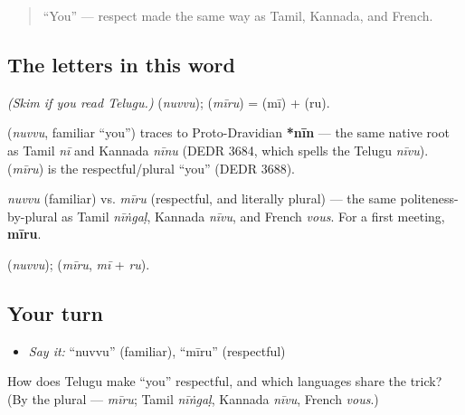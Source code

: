 \label{lesson:TE-C02-nuvvu-miiru}



\begin{quote}
\textquotedblleft{}You\textquotedblright{} — respect made the same way as Tamil, Kannada, and French.
\end{quote}

\subsection*{The letters in this word}
\emph{(Skim if you read Telugu.)} \textbf{} (\emph{nuvvu}); \textbf{} (\emph{mīru}) = \textbf{} (mī) + \textbf{} (ru).

\begin{cousinweb}
\textbf{} (\emph{nuvvu}, familiar \textquotedblleft{}you\textquotedblright{}) traces to Proto-Dravidian \textbf{*nīn} — the same native root as Tamil \emph{nī} and Kannada \emph{nīnu} (DEDR 3684, which spells the Telugu \emph{nīvu}). \textbf{} (\emph{mīru}) is the respectful/plural \textquotedblleft{}you\textquotedblright{} (DEDR 3688).
\end{cousinweb}

\begin{grammarlens}[title={Grammar Lens: respect by the plural}]
\emph{nuvvu} (familiar) vs. \emph{mīru} (respectful, and literally plural) — the same politeness-by-plural as Tamil \emph{nīṅgaḷ}, Kannada \emph{nīvu}, and French \emph{vous}. For a first meeting, \textbf{mīru}.
\end{grammarlens}

\begin{sounds}
 (\emph{nuvvu});  (\emph{mīru},  \emph{mī} +  \emph{ru}).
\end{sounds}

\subsection*{Your turn}
\begin{itemize}
\raggedright
  \item \emph{Say it:} \textquotedblleft{}nuvvu\textquotedblright{} (familiar), \textquotedblleft{}mīru\textquotedblright{} (respectful)
\end{itemize}

\begin{tcolorbox}[breakable,colback=teal!4,colframe=teal!35!black,title={Before you move on}]
How does Telugu make \textquotedblleft{}you\textquotedblright{} respectful, and which languages share the trick? (By the plural — \emph{mīru}; Tamil \emph{nīṅgaḷ}, Kannada \emph{nīvu}, French \emph{vous}.)
\end{tcolorbox}
